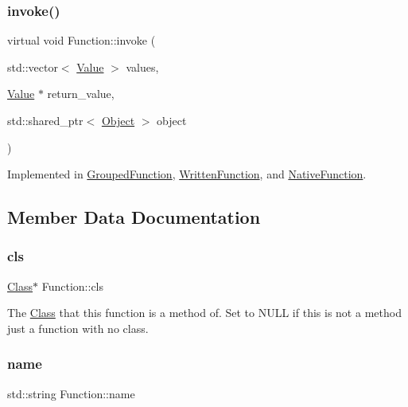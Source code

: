 \mbox{\label{classFunction_a84f9a63e68becc27e58ea738ba4cd698}} 
\subsubsection{\texorpdfstring{invoke()}{invoke()}}
{\footnotesize\ttfamily virtual void Function\+::invoke (\begin{DoxyParamCaption}\item[{std\+::vector$<$ \hyperlink{classValue}{Value} $>$}]{values,  }\item[{\hyperlink{classValue}{Value} $\ast$}]{return\+\_\+value,  }\item[{std\+::shared\+\_\+ptr$<$ \hyperlink{classObject}{Object} $>$}]{object }\end{DoxyParamCaption})\hspace{0.3cm}{\ttfamily [pure virtual]}}



Implemented in \hyperlink{classGroupedFunction_a90a74bd39250863046a7cb97ce013d2b}{Grouped\+Function}, \hyperlink{classWrittenFunction_afe56e5eb6a13f6e38ab5ec87e371d745}{Written\+Function}, and \hyperlink{classNativeFunction_a0f003d805cbc3625e311d1b2a1b861d9}{Native\+Function}.



\subsection{Member Data Documentation}
\mbox{\label{classFunction_a1d7e4e5dc199ee4a771a3e5732ea379c}} 
\subsubsection{\texorpdfstring{cls}{cls}}
{\footnotesize\ttfamily \hyperlink{classClass}{Class}$\ast$ Function\+::cls}

The \hyperlink{classClass}{Class} that this function is a method of. Set to N\+U\+LL if this is not a method just a function with no class. \mbox{\label{classFunction_a161d1ceb4f67f3222caf429fea7b71f1}} 
\subsubsection{\texorpdfstring{name}{name}}
{\footnotesize\ttfamily std\+::string Function\+::name}

